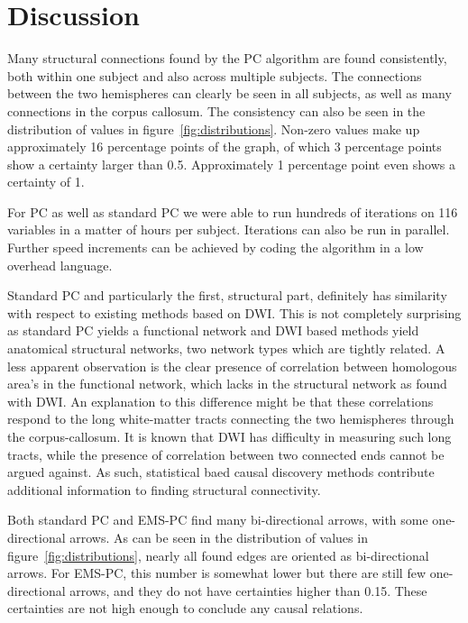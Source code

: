 \documentclass[a4paper, 10pt, english, onecolumn]{article}
\begin{document}
\section{Discussion}
Many structural connections found by the PC algorithm are found consistently, both within one subject and also across multiple subjects.
The connections between the two hemispheres can clearly be seen in all subjects, as well as many connections in the corpus callosum.
The consistency can also be seen in the distribution of values in figure~\ref{fig:distributions}.
Non-zero values make up approximately 16 percentage points of the graph, of which 3 percentage points show a certainty larger than 0.5.
Approximately 1 percentage point even shows a certainty of 1.


For PC as well as standard PC we were able to run hundreds of iterations on 116 variables in a matter of hours per subject.
Iterations can also be run in parallel.
Further speed increments can be achieved by coding the algorithm in a low overhead language.

Standard PC and particularly the first, structural part, definitely has similarity with respect to existing methods based on DWI.
This is not completely surprising as standard PC yields a functional network and DWI based methods yield anatomical structural networks, two network types which are tightly related.
A less apparent observation is the clear presence of correlation between homologous area's in the functional network, which lacks in the structural network as found with DWI.
An explanation to this difference might be that these correlations respond to the long white-matter tracts connecting the two hemispheres through the corpus-callosum.
It is known that DWI has difficulty in measuring such long tracts, while the presence of correlation between two connected ends cannot be argued against.
As such, statistical baed causal discovery methods contribute additional information to finding structural connectivity.

Both standard PC and EMS-PC find many bi-directional arrows, with some one-directional arrows.
As can be seen in the distribution of values in figure~\ref{fig:distributions}, nearly all found edges are oriented as bi-directional arrows.
For EMS-PC, this number is somewhat lower but there are still few one-directional arrows, and they do not have certainties higher than 0.15.
These certainties are not high enough to conclude any causal relations.
\end{document}
